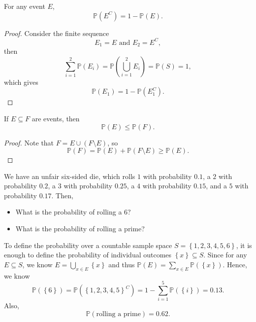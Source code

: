 \begin{proposition}
    For any event \(E\), 
    \[
        \mathbb{P} \left( E^C \right) = 1 - \mathbb{P} (E). 
    \] 
\end{proposition}

\begin{proof}
    Consider the finite sequence 
    \[
        E_1 = E \text{ and } E_2 = E^C, 
    \]
    then 
    \[
         \sum_{i=1}^2 \mathbb{P} (E_i) = \mathbb{P} \left( \bigcup_{i=1}^{2} E_i  \right) = \mathbb{P} (S) = 1, 
    \]
    which gives 
    \[
        \mathbb{P} (E_1) = 1 - \mathbb{P} \left( E_1^C \right). 
    \]
\end{proof}

\begin{proposition}[Monotonity]
    If \(E \subseteq F\) are events, then 
    \[
        \mathbb{P} (E) \le \mathbb{P} (F).
    \] 
\end{proposition}

\begin{proof}
    Note that \(F = E \cup \left( F \setminus E \right) \), so 
    \[
        \mathbb{P} (F) = \mathbb{P} (E) + \mathbb{P} (F \setminus E) \ge \mathbb{P} (E).
    \] 
\end{proof}

\begin{eg}
    We have an unfair six-sided die, which rolls \(1\) with probability \(0.1\), a \(2\) with probability \(0.2\), a \(3\) with probability \(0.25\), a \(4\) with probability \(0.15\), and a \(5\) with probability \(0.17\). Then, 
    \begin{itemize}
        \item [(a)] What is the probability of rolling a \(6\)? 
        \item [(b)] What is the probability of rolling a prime? 
    \end{itemize}         
\end{eg}
\begin{explanation}
    To define the probability over a countable sample space \(S = \left\{ 1, 2, 3, 4, 5, 6 \right\} \), it is enough to define the probability of individual outcomes \(\left\{ x \right\} \subseteq S \). Since for any \(E \subseteq S\), we know \(E = \bigcup_{x \in E}\left\{ x \right\}  \) and thus \(\mathbb{P} (E) = \sum_{x \in E} \mathbb{P} \left( \left\{ x \right\}  \right)  \). Hence, we know 
    \[
        \mathbb{P} (\left\{ 6 \right\} ) = \mathbb{P} \left( \left\{ 1,2,3,4,5 \right\}^C  \right) = 1 - \sum_{i=1}^5 \mathbb{P} \left( \left\{ i \right\}  \right) = 0.13.    
    \]
    Also, 
    \[
        \mathbb{P} (\text{rolling a prime} ) = 0.62.
    \]   
\end{explanation}

